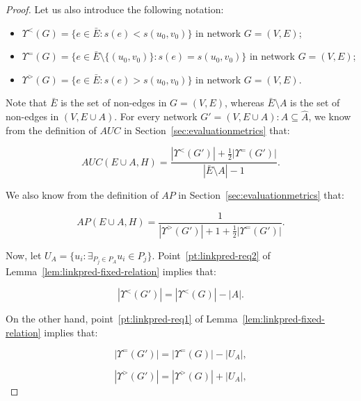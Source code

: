 \documentclass[twocolumn]{article}
\newcommand{\ROC}{\mathit{AUC}}
\newcommand{\AP}{\mathit{AP}}
\newcommand{\ER}{\bar{E}}
\newcommand{\FA}{\widehat{A}}
\newcommand{\Hide}{H}
\newcommand{\PA}{P_{A}}
\begin{document}
\begin{proof}
\noindent Let us also introduce the following notation:

\begin{itemize}\itemsep-0.3em
\item $\Upsilon^<(G) = \{e \in \ER: s(e) < s(u_0,v_0)\}$ in network $G=(V,E)$;
\item $\Upsilon^=(G) = \{e \in \ER \setminus \{(u_0,v_0)\}: s(e) = s(u_0,v_0)\}$ in network $G=(V,E)$;
\item $\Upsilon^>(G) = \{e \in \ER: s(e) > s(u_0,v_0)\}$ in network $G=(V,E)$.
\end{itemize}

\noindent Note that $\ER$ is the set of non-edges in $G=(V,E)$, whereas $\ER \setminus A$ is the set of non-edges in $(V,E\cup A)$. For every network $G'=(V,E \cup A):A \subseteq \FA$, we know from the definition of $\ROC$ in Section~\ref{sec:evaluationmetrics} that:

\begin{equation}
\label{eqn:linkpred-theorem-1}
\ROC(E \cup A, \Hide)=\frac{|\Upsilon^<(G')| + \frac{1}{2} |\Upsilon^=(G')|}{|\ER \setminus A|-1}.
\end{equation}

\noindent We also know from the definition of $\AP$ in Section~\ref{sec:evaluationmetrics} that:

\begin{equation}
\label{eqn:linkpred-theorem-2}
\AP(E \cup A,\Hide) = \frac{1}{|\Upsilon^>(G')| + 1 + \frac{1}{2} |\Upsilon^=(G')|} .
\end{equation}

\noindent Now, let $U_A = \{u_i:\exists_{P_j\in \PA} u_i \in P_j\}$.
Point~\ref{pt:linkpred-req2} of Lemma~\ref{lem:linkpred-fixed-relation} implies that:

\begin{equation}
\label{eqn:linkpred-theorem-3}
|\Upsilon^<(G')| = |\Upsilon^<(G)| - |A|.
\end{equation}

\noindent On the other hand, point~\ref{pt:linkpred-req1} of Lemma~\ref{lem:linkpred-fixed-relation} implies that:

\begin{equation}
\label{eqn:linkpred-theorem-4}
|\Upsilon^=(G')| = |\Upsilon^=(G)| - |U_A|,
\end{equation}


\begin{equation}
\label{eqn:linkpred-theorem-5}
|\Upsilon^>(G')| = |\Upsilon^>(G)| + |U_A|,
\end{equation}


\end{proof}
\end{document}
